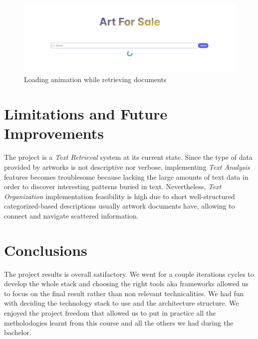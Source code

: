 \documentclass[12pt]{spieman}  %
\begin{document}
\begin{spacing}{1}
    \begin{figure}[H]
        \centering
        \caption{Loading animation while retrieving documents}
        \label{fig:loader}
        \includegraphics[width=\textwidth, trim={7cm 0cm 7cm 0cm}, clip]{figures/loading.jpeg}
    \end{figure}

    \section{Limitations and Future Improvements}

    The project is a \textit{Text Retrieval} system at its current state.
    Since the type of data provided by artworks is not descriptive nor verbose,
    implementing \textit{Text Analysis} features becomes troublesome because lacking the large amounts of
    text data in order to discover interesting patterns buried in text.
    Nevertheless, \textit{Text Organization} implementation feasibility is high due to
    short well-structured categorized-based descriptions usually artwork documents have,
    allowing to connect and navigate scattered information.

    \section{Conclusions}
    The project results is overall satifactory.
    We went for a couple iterations cycles to develop the whole stack and choosing the right tools aka frameworks
    allowed us to focus on the final result rather than non relevant technicalities.
    We had fun with deciding the technology stack to use and the architecture structure.
    We enjoyed the project freedom that allowed us to put in practice all the metholodogies
    learnt from this course and all the others we had during the bachelor.


\end{spacing}
\end{document}
